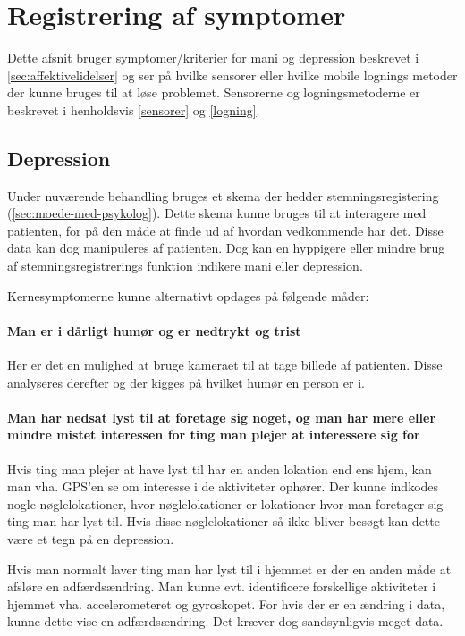 \section{Registrering af symptomer}
Dette afsnit bruger symptomer/kriterier for mani og depression beskrevet i \cref{sec:affektivelidelser} og ser på hvilke sensorer eller hvilke mobile lognings metoder der kunne bruges til at løse problemet.
Sensorerne og logningsmetoderne er beskrevet i henholdsvis \cref{sensorer} og \cref{logning}.

\subsection{Depression}
Under nuværende behandling bruges et skema der hedder stemningsregistering (\cref{sec:moede-med-psykolog}). Dette skema kunne bruges til at interagere med patienten, for på den måde at finde ud af hvordan vedkommende har det. Disse data kan dog manipuleres af patienten. Dog kan en hyppigere eller mindre brug af stemningsregistrerings funktion indikere mani eller depression.

Kernesymptomerne kunne alternativt opdages på følgende måder:

\paragraph{Man er i dårligt humør og er nedtrykt og trist}\label{darligthumor}
Her er det en mulighed at bruge kameraet til at tage billede af patienten. Disse analyseres derefter og der kigges på hvilket humør en person er i.

\paragraph{Man har nedsat lyst til at foretage sig noget, og man har mere eller mindre mistet interessen for ting man plejer at interessere sig for}
Hvis ting man plejer at have lyst til har en anden lokation end ens hjem, kan man vha. GPS'en se om interesse i de aktiviteter ophører. Der kunne indkodes nogle nøglelokationer, hvor nøglelokationer er lokationer hvor man foretager sig ting man har lyst til.
Hvis disse nøglelokationer så ikke bliver besøgt kan dette være et tegn på en depression.

Hvis man normalt laver ting man har lyst til i hjemmet er der en anden måde at afsløre en adfærdsændring. Man kunne evt. identificere forskellige aktiviteter i hjemmet vha. accelerometeret og gyroskopet. For hvis der er en ændring i data, kunne dette vise en adfærdsændring. Det kræver dog sandsynligvis meget data.

